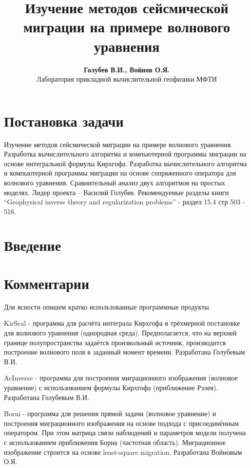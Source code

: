 \documentclass{article}
\begin{document}
\title{Изучение методов сейсмической миграции на примере волнового уравнения}
\author{\textbf{Голубев В.И., Войнов О.Я.} \\ Лаборатория прикладной вычислительной геофизики МФТИ}
\maketitle

\section{Постановка задачи}
Изучение методов сейсмической миграции на примере волнового уравнения.
Разработка вычислительного алгоритма и компьютерной программы миграции на основе интегральной формулы Кирхгофа.
Разработка вычислительного алгоритма и компьютерной программы миграции на основе сопряженного оператора для волнового уравнения.
Сравнительный анализ двух алгоритмов на простых моделях.
Лидер проекта – Василий Голубев.
Рекомендуемые разделы книги “Geophysical inverse theory and regularization problems” - раздел 15.4 стр 503 - 516.

\section{Введение}

\section{Комментарии}

Для ясности опишем кратко использованные программные продукты.

KirScal - программа для расчёта интеграла Кирхгофа в трёхмерной постановке для волнового уравнения (однородная среда). Предполагается, что на верхней границе полупространства задаётся произвольный источник, производится построение волнового поля в заданный момент времени. Разработана Голубевым В.И.

AcInverse - программа для построения миграционного изображения (волновое уравнение) с использованием формулы Кирхгофа (приближение Рэлея).
Разработана Голубевым В.И.

Borni - программа для решения прямой задачи (волновое уравнение) и построения миграционного изображения на основе подхода с присоединённым оператором.
При этом матрица связи наблюдений и параметров модели получена с использованием приближения Борна (частотная область).
Миграционное изображение строится на основе least-square migration.
Разработана Войновым О.Я.
\end{document}
